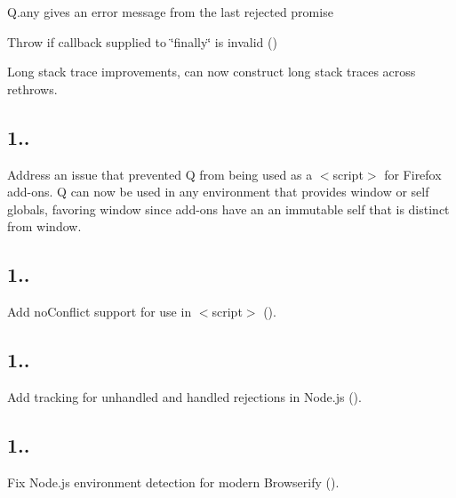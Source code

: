 
\begin{DoxyItemize}
\item Q.\+any gives an error message from the last rejected promise
\item Throw if callback supplied to \char`\"{}finally\char`\"{} is invalid ()
\item Long stack trace improvements, can now construct long stack traces across rethrows.
\end{DoxyItemize}

\subsection*{1..}


\begin{DoxyItemize}
\item Address an issue that prevented Q from being used as a {\ttfamily $<$script$>$} for Firefox add-\/ons. Q can now be used in any environment that provides {\ttfamily window} or {\ttfamily self} globals, favoring {\ttfamily window} since add-\/ons have an an immutable {\ttfamily self} that is distinct from {\ttfamily window}.
\end{DoxyItemize}

\subsection*{1..}


\begin{DoxyItemize}
\item Add {\ttfamily no\+Conflict} support for use in {\ttfamily $<$script$>$} ().
\end{DoxyItemize}

\subsection*{1..}


\begin{DoxyItemize}
\item Add tracking for unhandled and handled rejections in Node.\+js ().
\end{DoxyItemize}

\subsection*{1..}


\begin{DoxyItemize}
\item Fix Node.\+js environment detection for modern Browserify ().
\end{DoxyItemize}

